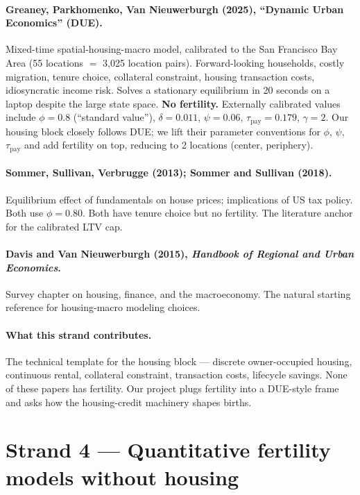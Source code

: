 \documentclass[11pt]{article}
\begin{document}
\paragraph{Greaney, Parkhomenko, Van Nieuwerburgh (2025), ``Dynamic Urban Economics'' (DUE).}
Mixed-time spatial-housing-macro model, calibrated to the San Francisco Bay Area (55 locations $=$ 3{,}025 location pairs). Forward-looking households, costly migration, tenure choice, collateral constraint, housing transaction costs, idiosyncratic income risk. Solves a stationary equilibrium in 20 seconds on a laptop despite the large state space. \textbf{No fertility.} Externally calibrated values include $\phi = 0.8$ (``standard value''), $\delta = 0.011$, $\psi = 0.06$, $\tau_{\text{pay}} = 0.179$, $\gamma = 2$. Our housing block closely follows DUE; we lift their parameter conventions for $\phi$, $\psi$, $\tau_{\text{pay}}$ and add fertility on top, reducing to 2 locations (center, periphery).

\paragraph{Sommer, Sullivan, Verbrugge (2013); Sommer and Sullivan (2018).}
Equilibrium effect of fundamentals on house prices; implications of US tax policy. Both use $\phi = 0.80$. Both have tenure choice but no fertility. The literature anchor for the calibrated LTV cap.

\paragraph{Davis and Van Nieuwerburgh (2015), \emph{Handbook of Regional and Urban Economics}.}
Survey chapter on housing, finance, and the macroeconomy. The natural starting reference for housing-macro modeling choices.

\paragraph{What this strand contributes.}
The technical template for the housing block --- discrete owner-occupied housing, continuous rental, collateral constraint, transaction costs, lifecycle savings. None of these papers has fertility. Our project plugs fertility into a DUE-style frame and asks how the housing-credit machinery shapes births.

\section{Strand 4 --- Quantitative fertility models without housing}
\end{document}
